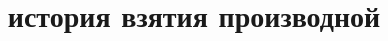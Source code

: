 \documentclass{article}
\begin{document}
    
  \title{история взятия производной}    
  \date{}    
  \maketitle
\end{document}

